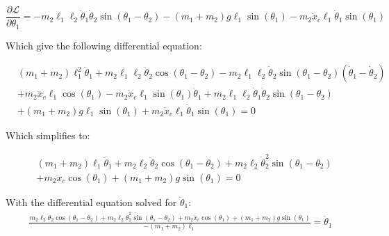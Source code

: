 \documentclass[10pt]{article}
\begin{document}
    
    \begin{equation} \label{eq: lagrange Step3}
        \frac{\partial \mathcal{L}}{\partial\theta_1} =
        -m_2\ell_1\ell_2\dot\theta_1\dot\theta_2\sin(\theta_1-\theta_2) 
        - (m_1 + m_2)g\ell_1\sin(\theta_1)
        -m_2\dot x_c\ell_1\dot\theta_1\sin(\theta_1)
    \end{equation}

    Which give the following differential equation:

    \begin{equation}
        \begin{aligned}
            &(m_1 + m_2)\ell_1^2\ddot\theta_1   +   m_2\ell_1\ell_2\ddot\theta_2\cos(\theta_1 - \theta_2)  -m_2\ell_1\ell_2\dot\theta_2\sin(\theta_1-\theta_2)(\dot\theta_1 - \dot\theta_2)\\
            &+   m_2\ddot x_c\ell_1\cos(\theta_1) - m_2 \dot x_c\ell_1\sin(\theta_1)\dot\theta_1 + m_2\ell_1\ell_2\dot\theta_1\dot\theta_2\sin(\theta_1-\theta_2) \\ 
            & + (m_1 + m_2)g\ell_1\sin(\theta_1) + m_2\dot x_c\ell_1\dot\theta_1\sin(\theta_1) = 0
        \end{aligned}
    \end{equation}   


    Which simplifies to:

    \begin{equation}
        \begin{aligned}
            &(m_1 + m_2)\ell_1\ddot\theta_1   +   m_2\ell_2\ddot\theta_2\cos(\theta_1 - \theta_2)  +  m_2\ell_2\dot\theta_2^2\sin(\theta_1-\theta_2)\\
            &+   m_2\ddot x_c\cos(\theta_1) + (m_1 + m_2)g\sin(\theta_1) = 0
        \end{aligned}
    \end{equation}  

    With the differential equation solved for $\ddot \theta_1$:
    \begin{equation}
        \begin{aligned}
            \frac{m_2\ell_2\ddot\theta_2\cos(\theta_1 - \theta_2)  +m_2\ell_2\dot\theta_2^2\sin(\theta_1-\theta_2)
            +   m_2\ddot x_c\cos(\theta_1) + (m_1 + m_2)g\sin(\theta_1)}{-(m_1 + m_2)\ell_1} = \ddot \theta_1
        \end{aligned}
    \end{equation}  
    
\end{document}
